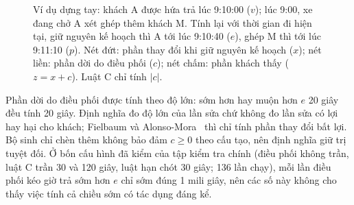 \begin{figure}[htbp]
\centering
{}
\caption{Ví dụ dựng tay: khách A được hứa trả lúc 9:10:00 ($v$); lúc 9:00, xe đang chở A xét ghép thêm khách
M. Tính lại với thời gian đi hiện tại, giữ nguyên kế hoạch thì A tới lúc 9:10:40 ($e$), ghép M thì tới lúc
9:11:10 ($p$). Nét đứt: phần thay đổi khi giữ nguyên kế hoạch ($x$); nét liền: phần dời do điều phối ($c$);
nét chấm: phần khách thấy ($z = x + c$). Luật C chỉ tính $|c|$.}
\label{hinh:bamoc}
\end{figure}

Phần dời do điều phối được tính theo độ lớn: sớm hơn hay muộn hơn $e$ 20 giây đều tính 20 giây. Định nghĩa đo
độ lớn của lần sửa chứ không đo lần sửa có lợi hay hại cho khách; Fielbaum và Alonso-Mora~\cite{fielbaum2020}
thì chỉ tính phần thay đổi bất lợi. Bộ sinh chỉ chèn thêm không bảo đảm $c \ge 0$ theo cấu tạo, nên định nghĩa
giữ trị tuyệt đối. Ở bốn cấu hình đã kiểm của tập kiểm tra chính (điều phối không trần, luật C trần 30 và 120
giây, luật hạn chót 30 giây; 136 lần chạy), mỗi lần điều phối kéo giờ trả sớm hơn $e$ chỉ sớm đúng 1 mili
giây, nên các số này không cho thấy việc tính cả chiều sớm có tác dụng đáng kể.


